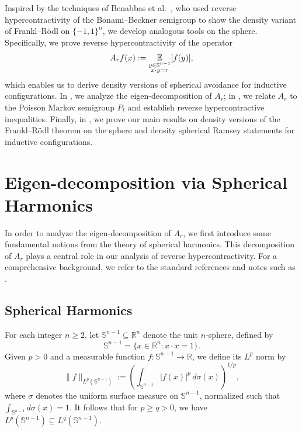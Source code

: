 \documentclass[11pt]{article}
\newcommand{\E}{\mathop{\mathbb E\/}}
\begin{document}
\smallskip
Inspired by the techniques of Benabbas et al.~\cite{benabbas2012isoperimetric}, who used reverse hypercontractivity of the Bonami–Beckner semigroup to show the density variant of Frankl–R\"{o}dl on $\{-1,1\}^n$, we develop analogous tools on the sphere. Specifically, we prove reverse hypercontractivity of the operator
\[
A_r f(x) := \E_{\substack{y \in \mathbb{S}^{n-1} \\ x \cdot y = r}} [f(y)],
\]
which enables us to derive density versions of spherical avoidance for inductive configurations. In , we analyze the eigen-decomposition of \( A_r \); in , we relate \( A_r \) to the Poisson Markov semigroup \( P_t \) and establish reverse hypercontractive inequalities. Finally, in , we prove our main results on density versions of the Frankl–R\"{o}dl theorem on the sphere and density spherical Ramsey statements for inductive configurations.

\section{Eigen-decomposition via Spherical Harmonics}\label{sec: spherical harmonics}
In order to analyze the eigen-decomposition of $A_r$, we first introduce some fundamental notions from the theory of spherical harmonics. This decomposition of $A_r$ plays a central role in our analysis of reverse hypercontractivity. For a comprehensive background, we refer to the standard references \cite{muller2006spherical, stein1971introduction} and notes such as \cite{gallier2009notes}.

\subsection{Spherical Harmonics}

For each integer $n \geq 2$, let $\mathbb{S}^{n-1} \subseteq \mathbb{R}^n$ denote the unit $n$-sphere, defined by
\[
\mathbb{S}^{n-1} = \{ x \in \mathbb{R}^n : x \cdot x = 1\}.
\]
Given $p > 0$ and a measurable function $f: \mathbb{S}^{n-1} \to \mathbb{R}$, we define its $L^p$ norm by
\[
\|f\|_{L^p(\mathbb{S}^{n-1})} := \left( \int_{\mathbb{S}^{n-1}} |f(x)|^p \, d\sigma(x) \right)^{1/p},
\]
where $\sigma$ denotes the uniform surface measure on $\mathbb{S}^{n-1}$, normalized such that $\int_{\mathbb{S}^{n-1}} d\sigma(x) = 1$. It follows that for $p \geq q > 0$, we have $L^p(\mathbb{S}^{n-1}) \subseteq L^q(\mathbb{S}^{n-1})$.
\end{document}
